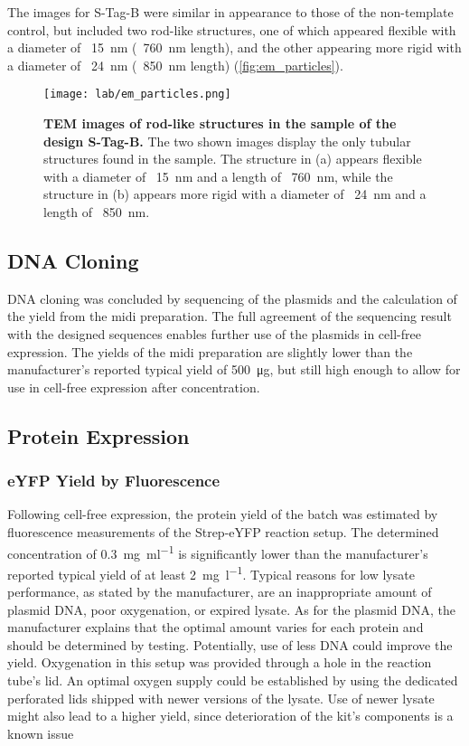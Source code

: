 The images for S-Tag-B were similar in appearance to those of the non-template control, but included two rod-like structures, one of which appeared flexible with a diameter of ~\SI{15}{\nano\meter} (~\SI{760}{\nano\meter} length), and the other appearing more rigid with a diameter of ~\SI{24}{\nano\meter} (~\SI{850}{\nano\meter} length) (\autoref{fig:em_particles}). 

\begin{figure}
\texttt{[image: lab/em\_particles.png]}
\caption{\textbf{TEM images of rod-like structures in the sample of the design S-Tag-B. } The two shown images display the only tubular structures found in the sample. The structure in (a) appears flexible with a diameter of ~\SI{15}{\nano\meter} and a length of ~\SI{760}{\nano\meter}, while the structure in (b) appears more rigid with a diameter of ~\SI{24}{\nano\meter} and a length of ~\SI{850}{\nano\meter}.}
\label{fig:em_particles}
\end{figure}

\subsection{DNA Cloning}
DNA cloning was concluded by sequencing of the plasmids and the calculation of the yield from the midi preparation. The full agreement of the sequencing result with the designed sequences enables further use of the plasmids in cell-free expression. The yields of the midi preparation are slightly lower than the manufacturer's reported typical yield of \SI{500}{\micro\gram}, but still high enough to allow for use in cell-free expression after concentration. 

\subsection{Protein Expression}
\subsubsection{eYFP Yield by Fluorescence}
Following cell-free expression, the protein yield of the batch was estimated by fluorescence measurements of the Strep-eYFP reaction setup. The determined concentration of \SI{0.3}{\milli\gram\per\milli\litre} is significantly lower than the manufacturer's reported typical yield of at least \SI{2}{\milli\gram\per\litre}. Typical reasons for low lysate performance, as stated by the manufacturer, are an inappropriate amount of plasmid DNA, poor oxygenation, or expired lysate. As for the plasmid DNA, the manufacturer explains that the optimal amount varies for each protein and should be determined by testing. Potentially, use of less DNA could improve the yield. Oxygenation in this setup was provided through a hole in the reaction tube's lid. An optimal oxygen supply could be established by using the dedicated perforated lids shipped with newer versions of the lysate. Use of newer lysate might also lead to a higher yield, since deterioration of the kit's components is a known issue 

